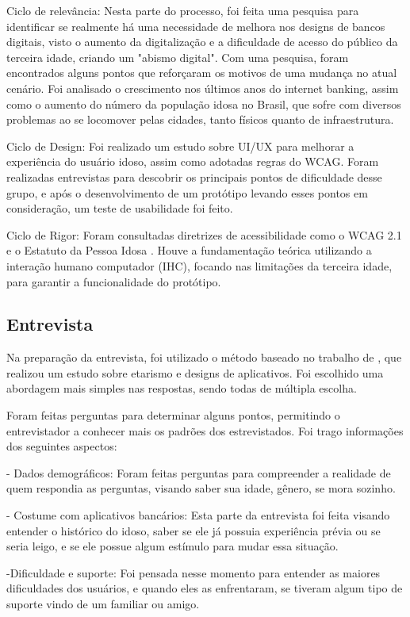 Ciclo de relevância: Nesta parte do processo, foi feita uma pesquisa para identificar se realmente há uma necessidade de melhora nos designs de bancos digitais, visto o aumento da digitalização e a dificuldade de acesso do público da terceira idade, criando um "abismo digital". Com uma pesquisa, foram encontrados alguns pontos que reforçaram os motivos de uma mudança no atual cenário. Foi analisado o crescimento nos últimos anos do internet banking, assim como o aumento do número da população idosa no Brasil, que sofre com diversos problemas ao se locomover pelas cidades, tanto físicos quanto de infraestrutura.

Ciclo de Design: Foi realizado um estudo sobre UI/UX para melhorar a experiência do usuário idoso, assim como adotadas regras do WCAG. Foram realizadas entrevistas para descobrir os principais pontos de dificuldade desse grupo, e após o desenvolvimento de um protótipo levando esses pontos em consideração, um teste de usabilidade foi feito.

Ciclo de Rigor: Foram consultadas diretrizes de acessibilidade como o WCAG 2.1 e o Estatuto da Pessoa Idosa \citep{estatuto_idoso}. Houve a fundamentação teórica utilizando a interação humano computador (IHC), focando nas limitações da terceira idade, para garantir a funcionalidade do protótipo.

\subsection*{Entrevista}

Na preparação da entrevista, foi utilizado o método baseado no trabalho de \citep{hickmann2025etarismo}, que realizou um estudo sobre etarismo e designs de aplicativos. Foi escolhido uma abordagem mais simples nas respostas, sendo todas de múltipla escolha.

Foram feitas perguntas para determinar alguns pontos, permitindo o entrevistador a conhecer mais os padrões dos estrevistados. Foi trago informações dos seguintes aspectos:

- Dados demográficos:
Foram feitas perguntas para compreender a realidade de quem respondia as perguntas, visando saber sua idade, gênero, se mora sozinho.

- Costume com aplicativos bancários:
Esta parte da entrevista foi feita visando entender o histórico do idoso, saber se ele já possuia experiência prévia ou se seria leigo, e se ele possue algum estímulo para mudar essa situação.

-Dificuldade e suporte:
Foi pensada nesse momento para entender as maiores dificuldades dos usuários, e quando eles as enfrentaram, se tiveram algum tipo de suporte vindo de um familiar ou amigo.

